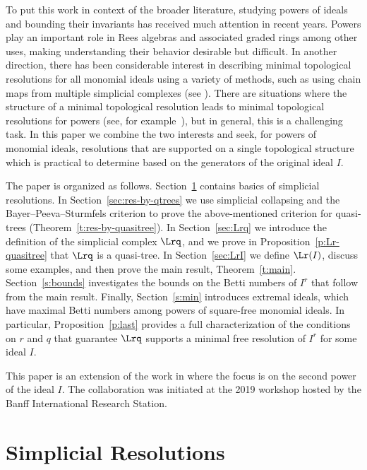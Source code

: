To put this work in context of the broader literature, studying powers
of ideals and bounding their invariants has received much attention in
recent years. Powers play an important role in Rees algebras and
associated graded rings among other uses, making understanding their
behavior desirable but difficult. In another direction, there has been
considerable interest in describing minimal topological resolutions
for all monomial ideals using a variety of methods, such as using
chain maps from multiple simplicial complexes \textup{(}see \cite{EMO,
  Tch}\textup{)}. There are situations where the structure of a
minimal topological resolution leads to minimal topological
resolutions for powers (see, for example~\cite{morse,koszul,FH}), but in
general, this is a challenging task. In this paper we combine the two
interests and seek, for powers of monomial ideals, resolutions that
are supported on a single topological structure which is practical to
determine based on the generators of the original ideal $I$.

The paper is organized as follows. Section~\ref{sec:background} contains
basics of simplicial resolutions. In Section~\ref{sec:res-by-qtrees} we use
simplicial collapsing and the Bayer--Peeva--Sturmfels criterion to
prove the above-mentioned criterion for quasi-trees
\textup{(}Theorem~\ref{t:res-by-quasitree}\textup{)}.  In Section~\ref{sec:Lrq} we introduce the
definition of the simplicial complex $\Lrq$, and we prove in
Proposition~\ref{p:Lr-quasitree} that $\Lrq$ is a quasi-tree.  In Section~\ref{sec:LrI}
we define $\Lr(I)$, discuss some examples, and then prove the main
result, Theorem~\ref{t:main}. Section~\ref{s:bounds} investigates the bounds on the
Betti numbers of $I^r$ that follow from the main result.  Finally,
Section~\ref{s:min} introduces extremal ideals, which have maximal Betti
numbers among powers of square-free monomial ideals. In particular,
Proposition~\ref{p:last} provides a full characterization of the conditions on
$r$ and $q$ that guarantee $\Lrq$ supports a minimal free resolution
of $I^r$ for some ideal $I$.

This paper is an extension of the work in \cite{L2} where
the focus is on the second power of the ideal $I$.  The collaboration
was initiated at the 2019 workshop 
hosted by the Banff International Research Station.






\section{Simplicial Resolutions}
\label{sec:background}

